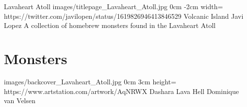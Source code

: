 \documentclass[letterpaper,openany,twoside,twocolumn]{book}
\begin{document}
	\bookTitlePage
		{Lavaheart Atoll}
		{images/titlepage_Lavaheart_Atoll.jpg}
		{0cm}
		{-2cm}
		{width=\paperwidth}
		{https://twitter.com/javilopen/status/1619826946413846529}
		{Volcanic Island}
		{Javi Lopez}
		{A collection of homebrew monsters found in the Lavaheart Atoll}
	
	\tableofcontents
	
	\mainmatter
	
	\MonsterSheetGeometry
	\part{Monsters}
	
	
	\bookLastPage
		{images/backcover_Lavaheart_Atoll.jpg}
		{0cm}
		{3cm}
		{height=\paperheight}
		{https://www.artstation.com/artwork/AqNRWX}
		{Dashara Lava Hell}
		{Dominique van Velsen}
		{}
\end{document}
